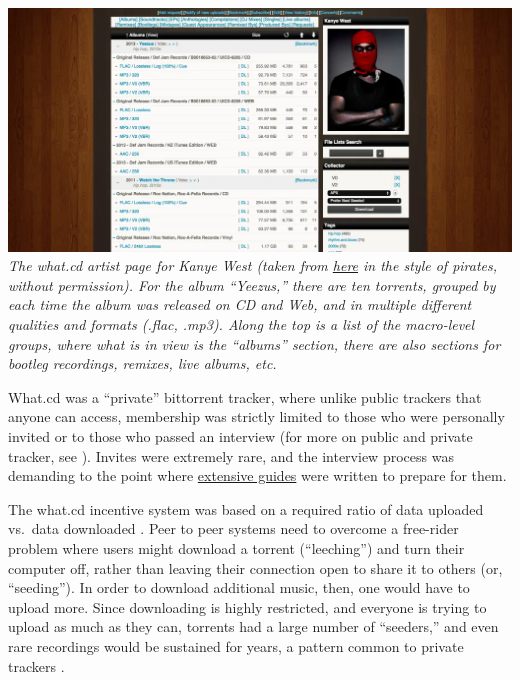 \documentclass[10pt]{article}
\begin{document}
\begin{multicols}{2}
\includegraphics[width=\linewidth]{../assets/images/kanye-what.png} \emph{The
what.cd artist page for Kanye West (taken from
\href{https://qz.com/840661/what-cd-is-gone-a-eulogy-for-the-greatest-music-collection-in-the-world/}{here}
in the style of pirates, without permission). For the album ``Yeezus,''
there are ten torrents, grouped by each time the album was released on
CD and Web, and in multiple different qualities and formats (.flac,
.mp3). Along the top is a list of the macro-level groups, where what is
in view is the ``albums'' section, there are also sections for bootleg
recordings, remixes, live albums, etc.}

What.cd was a ``private'' bittorrent tracker, where unlike public
trackers that anyone can access, membership was strictly limited to
those who were personally invited or to those who passed an interview
(for more on public and private tracker, see \cite{meulpolderPublicPrivateBitTorrent} ). Invites were extremely rare,
and the interview process was demanding to the point where
\href{https://opentrackers.org/whatinterviewprep.com/index.html}{extensive
guides} were written to prepare for them.

The what.cd incentive system was based on a required ratio of data
uploaded vs.~data downloaded \cite{jiaHowSurviveThrive2013} .
Peer to peer systems need to overcome a free-rider problem where users
might download a torrent (``leeching'') and turn their computer off,
rather than leaving their connection open to share it to others (or,
``seeding''). In order to download additional music, then, one would
have to upload more. Since downloading is highly restricted, and
everyone is trying to upload as much as they can, torrents had a large
number of ``seeders,'' and even rare recordings would be sustained for
years, a pattern common to private trackers \cite{liuUnderstandingImprovingRatio2010} .


\end{multicols}
\end{document}
